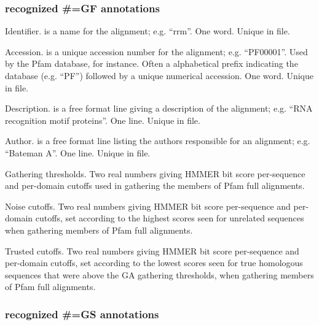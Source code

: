 \subsubsection{recognized \#=GF annotations}
\begin{sreitems}{}
\item [\emprog{ID  <s>}] 
        Identifier.  is a name for the alignment;
        e.g. ``rrm''. One word. Unique in file.

\item [\emprog{AC  <s>}]
        Accession.  is a unique accession number for the
        alignment; e.g. 
        ``PF00001''. Used by the Pfam database, for instance. 
        Often a alphabetical prefix indicating the database
        (e.g. ``PF'') followed by a unique numerical accession.
        One word. Unique in file. 
        
\item [\emprog{DE  <s>}]
        Description.  is a free format line giving
        a description of the alignment; e.g.
        ``RNA recognition motif proteins''. One line. Unique in file.

\item [\emprog{AU  <s>}]
        Author.  is a free format line listing the 
        authors responsible for an alignment; e.g. 
        ``Bateman A''. One line. Unique in file.

\item [\emprog{GA  <f> <f>}]
        Gathering thresholds. Two real numbers giving HMMER bit score
        per-sequence and per-domain cutoffs used in gathering the
        members of Pfam full alignments. 
        
\item [\emprog{NC  <f> <f>}]
        Noise cutoffs. Two real numbers giving HMMER bit score
        per-sequence and per-domain cutoffs, set according to the
        highest scores seen for unrelated sequences when gathering
        members of Pfam full alignments.

\item [\emprog{TC  <f> <f>}]
        Trusted cutoffs. Two real numbers giving HMMER bit score
        per-sequence and per-domain cutoffs, set according to the
        lowest scores seen for true homologous sequences that
        were above the GA gathering thresholds, when gathering
        members of Pfam full alignments. 
\end{sreitems}

\subsubsection{recognized \#=GS annotations}

